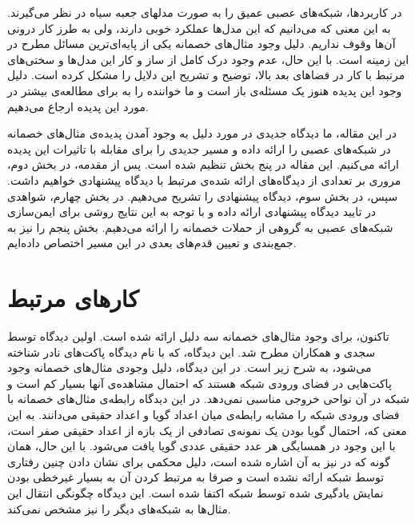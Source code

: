\documentclass[12pt,onecolumn,a4paper]{article}
\begin{document}
در کاربردها، شبکه‌های عصبی عمیق را به صورت مدلهای جعبه سیاه در نظر می‌گیرند. به این معنی که می‌دانیم که این مدل‌ها عملکرد خوبی دارند، ولی به طرز کار درونی آن‌ها وقوف نداریم. دلیل وجود مثال‌های خصمانه یکی از پایه‌ای‌ترین مسائل  مطرح در این زمینه است. با این حال، عدم وجود درک کامل از ساز و کار این مدل‌ها و سختی‌های مرتبط با کار در فضاهای بعد بالا، توضیح و تشریح این دلایل را مشکل کرده است. دلیل وجود این پدیده هنوز یک مسئله‌ی باز است و ما خواننده را به \cite{Yuan_2019} برای مطالعه‌ی بیشتر در مورد این پدیده ارجاع می‌دهیم.

در این مقاله، ما دیدگاه جدیدی در مورد دلیل به وجود آمدن پدیده‌ی مثال‌های خصمانه در شبکه‌های عصبی را ارائه داده و مسیر جدیدی را برای مقابله با تاثیرات این پدیده ارائه می‌کنیم. این مقاله در پنج بخش تنظیم شده است. پس از مقدمه، در بخش دوم، مروری بر تعدادی از دیدگاه‌های ارائه شده‌ی مرتبط با دیدگاه پیشنهادی خواهیم داشت. سپس، در بخش سوم، دیدگاه پیشنهادی را تشریح می‌دهیم. در بخش چهارم، شواهدی  در تایید دیدگاه پیشنهادی ارائه داده و با توجه به این نتایج روشی برای ایمن‌سازی شبکه‌های عصبی به گروهی از حملات خصمانه را ارائه می‌دهیم. بخش پنجم را نیز به جمع‌بندی و تعیین قدم‌های بعدی در این مسیر اختصاص داده‌ایم.

\section{کارهای مرتبط}
تاکنون، برای وجود مثال‌های خصمانه سه دلیل ارائه شده است. اولین دیدگاه توسط سجدی و همکاران\cite{szegedy2013intriguing}
مطرح شد. این دیدگاه، که با نام دیدگاه پاکت‌های نادر شناخته می‌شود، به شرح زیر است. در این دیدگاه، دلیل وجودی مثال‌های خصمانه وجود پاکت‌هایی در فضای ورودی شبکه هستند که احتمال مشاهده‌ی آنها بسیار کم است و شبکه در آن نواحی خروجی مناسبی نمی‌دهد. در این دیدگاه رابطه‌ی مثال‌های خصمانه با فضای ورودی شبکه را مشابه رابطه‌ی میان اعداد گویا و اعداد حقیقی می‌دانند. به این معنی که، احتمال گویا بودن یک نمونه‌ی تصادفی از یک بازه از اعداد حقیقی صفر است، با این وجود در همسایگی هر عدد حقیقی عددی گویا یافت می‌شود. با این حال،
همان گونه که در
\cite{tanay2016boundary}
نیز به آن اشاره شده است، دلیل محکمی برای نشان دادن چنین رفتاری توسط شبکه ارائه نشده است و صرفا به مرتبط کردن آن به بسیار غیرخطی بودن نمایش یادگیری شده توسط شبکه اکتفا شده است. این دیدگاه چگونگی انتقال این مثال‌ها به شبکه‌های دیگر را نیز مشخص نمی‌کند.
\end{document}
